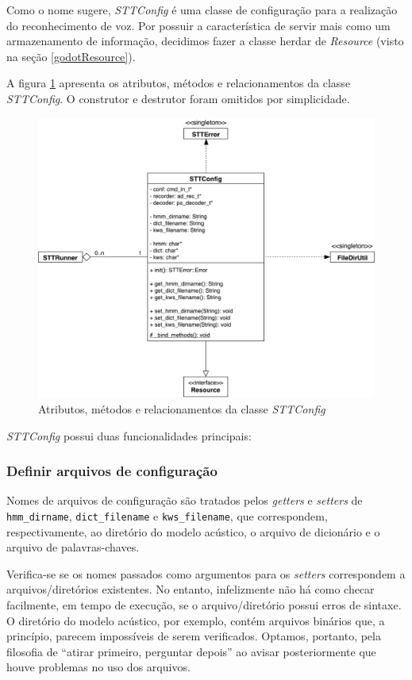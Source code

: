 Como o nome sugere, \textit{STTConfig} é uma classe de configuração para a realização do reconhecimento de voz. Por possuir a característica de servir mais como um armazenamento de informação, decidimos fazer a classe herdar de \textit{Resource} (visto na seção \ref{godotResource}).

A figura \ref{stt-config} apresenta os atributos, métodos e relacionamentos da classe \textit{STTConfig}. O construtor e destrutor foram omitidos por simplicidade.

\begin{figure}[H]
  \centering
  \includegraphics[width=.9\textwidth]{image/stt-config.pdf}
  \caption{Atributos, métodos e relacionamentos da classe \textit{STTConfig}}
  \label{stt-config}
\end{figure}

\textit{STTConfig} possui duas funcionalidades principais:

\subsubsection{Definir arquivos de configuração}

Nomes de arquivos de configuração são tratados pelos \textit{getters} e \textit{setters} de \texttt{hmm\_dirname}, \texttt{dict\_filename} e \texttt{kws\_filename}, que correspondem, respectivamente, ao diretório do modelo acústico, o arquivo de dicionário e o arquivo de palavras-chaves.

Verifica-se se os nomes passados como argumentos para os \textit{setters} correspondem a arquivos/diretórios existentes. No entanto, infelizmente não há como checar facilmente, em tempo de execução, se o arquivo/diretório possui erros de sintaxe. O diretório do modelo acústico, por exemplo, contém arquivos binários que, a princípio, parecem impossíveis de serem verificados. Optamos, portanto, pela filosofia de ``atirar primeiro, perguntar depois'' ao avisar posteriormente que houve problemas no uso dos arquivos.

